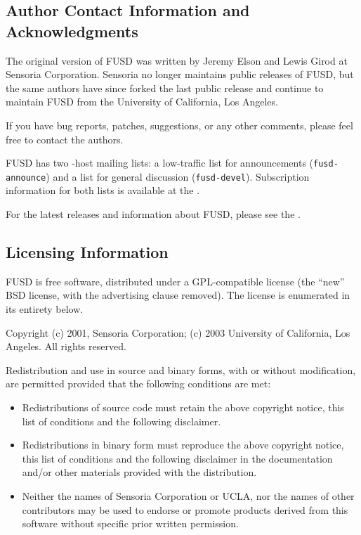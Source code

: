 \documentclass{article}
\begin{document}
\subsection{Author Contact Information and Acknowledgments}

The original version of FUSD was written by Jeremy Elson
and Lewis Girod at Sensoria Corporation.
Sensoria no longer maintains public releases of FUSD, but the same
authors have since forked the last public release and continue to
maintain FUSD from the University of California, Los Angeles.

If you have bug reports, patches, suggestions, or any other comments,
please feel free to contact the authors.

FUSD has two
-host
mailing lists: a low-traffic list for announcements ({\tt fusd-announce})
and a list for general discussion ({\tt fusd-devel}).  Subscription
information for both lists is available at the
.

For the latest releases and information about FUSD, please see the
.



\subsection{Licensing Information}

FUSD is free software, distributed under a GPL-compatible license (the
``new'' BSD license, with the advertising clause removed).  The
license is enumerated in its entirety below.

Copyright (c) 2001, Sensoria Corporation; (c) 2003 University of
California, Los Angeles.  All rights reserved.

Redistribution and use in source and binary forms, with or without
modification, are permitted provided that the following conditions are
met:
\begin{itemize}
\item Redistributions of source code must retain the above copyright
notice, this list of conditions and the following disclaimer.

\item Redistributions in binary form must reproduce the above
copyright notice, this list of conditions and the following disclaimer
in the documentation and/or other materials provided with the
distribution.

\item Neither the names of Sensoria Corporation or UCLA, nor the
names of other contributors may be used to endorse or promote products
derived from this software without specific prior written permission.
\end{itemize}
\end{document}
